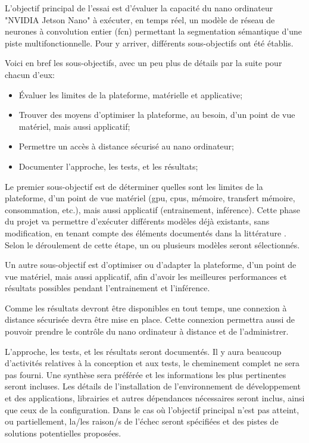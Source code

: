 ﻿\par L'objectif principal de l'essai est d'évaluer la capacité du nano ordinateur "NVIDIA Jetson Nano" à exécuter, en temps réel, un modèle de réseau de neurones à convolution entier (\acrshort{fcn}) permettant la segmentation sémantique d'une piste multifonctionnelle. Pour y arriver, différents sous-objectifs ont été établis. 
\par Voici en bref les sous-objectifs, avec un peu plus de détails par la suite pour chacun d'eux: 
\begin{itemize}
   \item Évaluer les limites de la plateforme, matérielle et applicative; 
   \item Trouver des moyens d'optimiser la plateforme, au besoin, d'un point de vue matériel, mais aussi applicatif; 
   \item Permettre un accès à distance sécurisé au nano ordinateur;
   \item Documenter l'approche, les tests, et les résultats;
\end{itemize}
\vspace{1\baselineskip}
\par Le premier sous-objectif est de déterminer quelles sont les limites de la plateforme, d'un point de vue matériel (\acrshort{gpu}, \acrshort{cpu}s, mémoire, transfert mémoire, consommation, etc.), mais aussi applicatif (entrainement, inférence). Cette phase du projet va permettre d'exécuter différents modèles déjà existants, sans  modification, en tenant compte des éléments documentés dans la littérature \cite{nguyen_mavnet_2019} \cite{zheng_real-time_2020} \cite{nvidia_jetson_2019-1}. Selon le déroulement de cette étape, un ou plusieurs modèles seront sélectionnés. 
\par Un autre sous-objectif est d'optimiser ou d'adapter la plateforme, d'un point de vue matériel, mais aussi applicatif, afin d'avoir les meilleures performances et résultats possibles pendant l'entrainement et l'inférence.
\par Comme les résultats devront être disponibles en tout temps, une connexion à distance sécurisée devra être mise en place. Cette connexion permettra aussi de pouvoir prendre le contrôle du nano ordinateur à distance et de l'administrer.
\par L'approche, les tests, et les résultats seront documentés. Il y aura beaucoup d'activités relatives à la conception et aux tests, le cheminement complet ne sera pas fourni. Une synthèse sera préférée et les informations les plus pertinentes seront incluses. Les détails de l'installation de l'environnement de développement et des applications, librairies et autres dépendances nécessaires seront inclus, ainsi que ceux de la configuration. Dans le cas où l'objectif principal n'est pas atteint, ou partiellement, la/les raison/s de l'échec seront spécifiées et des pistes de solutions potentielles proposées.